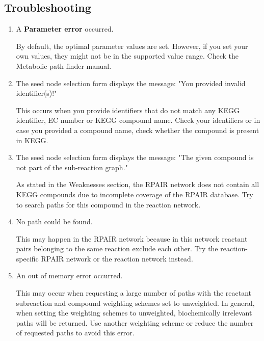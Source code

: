 \subsection{Troubleshooting}

\begin{enumerate}

\item A \textbf{Parameter error} occurred.

	By default, the optimal parameter values are set. However, if you set your own values, they might not
	be in the supported value range. Check the Metabolic path finder manual.

\item The seed node selection form displays the message: "You provided invalid identifier(s)!"

     This occurs when you provide identifiers that do not match any KEGG identifier, EC number or KEGG
     compound name. Check your identifiers or in case you provided a compound name, check whether the
     compound is present in KEGG.

\item The seed node selection form displays the message: "The given compound is not part of the sub-reaction graph."

     As stated in the Weaknesses section, the RPAIR network does not contain all KEGG compounds due to incomplete
     coverage of the RPAIR database. Try to search paths for this compound in the reaction network.

\item No path could be found.

	This may happen in the RPAIR network because in this network reactant pairs belonging to the same reaction
	exclude each other. Try the reaction-specific RPAIR network or the reaction network instead.

\item An out of memory error occurred.

 	This may occur when requesting a large number of paths with the reactant subreaction and compound weighting schemes
 	set to unweighted. In general, when setting the weighting schemes to unweighted, biochemically irrelevant paths
 	will be returned. Use another weighting scheme or reduce the number of requested paths to avoid this error.

\end{enumerate}







